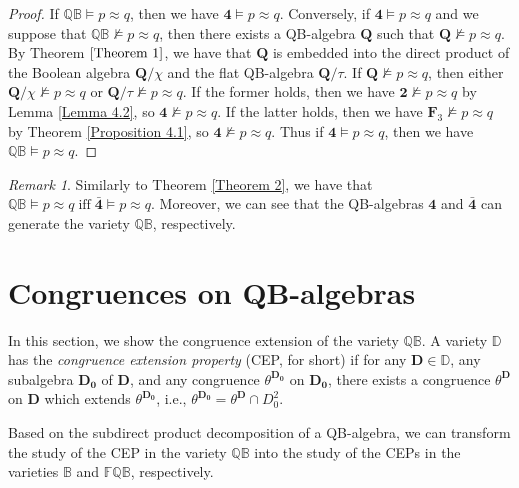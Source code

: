 \documentclass[12pt]{amsart}
\theoremstyle{definition}
\theoremstyle{remark}
\newtheorem{remark}{Remark}[section]
\numberwithin{equation}{section}
\begin{document}
\begin{proof}
If $\mathbb{QB}\models p\approx q$, then we have $\mathrm{\mathbf{4}}\models p\approx q$.
Conversely, if $\mathrm{\mathbf{4}}\models p\approx q$ and we suppose that $\mathbb{QB}\nvDash p\approx q$, then there exists a QB-algebra $\mathrm{\mathbf{Q}}$ such that $\mathrm{\mathbf{Q}}\nvDash p\approx q$. By Theorem $\ref{Theorem 1}$, we have that $\mathrm{\mathbf{Q}}$ is embedded into the direct product of the Boolean algebra $\mathbf{Q}/ \chi$ and the flat QB-algebra $\mathbf{Q}/ \tau$. If $\mathrm{\mathbf{Q}}\nvDash p\approx q$, then either $\mathbf{Q}/ \chi\nvDash p\approx q$ or $\mathbf{Q}/ \tau\nvDash p\approx q$. If the former holds, then we have $\mathrm{\mathbf{2}}\nvDash p\approx q$ by Lemma \ref{Lemma 4.2}, so $\mathrm{\mathbf{4}}\nvDash p\approx q$. If the latter holds, then we have $\mathrm{\mathbf{F}_{3}}\nvDash p\approx q$ by Theorem \ref{Proposition 4.1}, so $\mathrm{\mathbf{4}}\nvDash p\approx q$. Thus if $\mathrm{\mathbf{4}}\models p\approx q$, then we have $\mathbb{QB}\models p\approx q$.
\end{proof}

\begin{remark}\label{FQB variety}
Similarly to Theorem \ref{Theorem 2}, we have that
$\mathbb{QB}\models p\approx q\; \mathrm{iff} \; \bar{\mathbf{4}}\models p \approx q$.
Moreover, we can see that the QB-algebras $\mathbf{4}$ and $\bar{\mathbf{4}}$ can generate the variety $\mathbb{QB}$, respectively.
\end{remark}


\section{Congruences on QB-algebras}

In this section, we show the congruence extension of the variety $\mathbb{QB}$. A variety $\mathbb{D}$ has the \emph{congruence extension property} (CEP, for short) if
for any $\mathbf{D}\in \mathbb{D}$, any subalgebra $\mathbf{D_{0}}$ of $\mathbf{D}$, and any congruence $\theta^{\mathbf{D_{0}}}$ on $\mathbf{D_{0}}$, there exists a congruence $\theta^{\mathbf{D}}$ on $\mathbf{D}$ which extends $\theta^{\mathbf{D_{0}}}$, i.e., $\theta^{\mathbf{D_{0}}} = \theta^{\mathbf{D}} \cap D_{0}^{2}$.

Based on the subdirect product decomposition of a QB-algebra, we can transform the study of the CEP in the variety $\mathbb{QB}$ into the study of the CEPs in the varieties $\mathbb{B}$ and $\mathbb{FQB}$, respectively.
\end{document}
